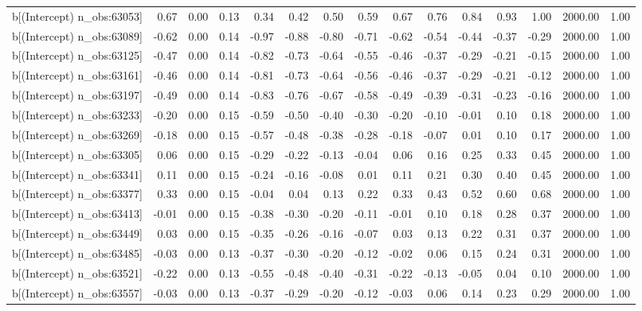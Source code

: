 \begin{table}[ht]
\begin{tabular}{rrrrrrrrrrrrrrr}
  b[(Intercept) n\_obs:63053] & 0.67 & 0.00 & 0.13 & 0.34 & 0.42 & 0.50 & 0.59 & 0.67 & 0.76 & 0.84 & 0.93 & 1.00 & 2000.00 & 1.00 \\ 
  b[(Intercept) n\_obs:63089] & -0.62 & 0.00 & 0.14 & -0.97 & -0.88 & -0.80 & -0.71 & -0.62 & -0.54 & -0.44 & -0.37 & -0.29 & 2000.00 & 1.00 \\ 
  b[(Intercept) n\_obs:63125] & -0.47 & 0.00 & 0.14 & -0.82 & -0.73 & -0.64 & -0.55 & -0.46 & -0.37 & -0.29 & -0.21 & -0.15 & 2000.00 & 1.00 \\ 
  b[(Intercept) n\_obs:63161] & -0.46 & 0.00 & 0.14 & -0.81 & -0.73 & -0.64 & -0.56 & -0.46 & -0.37 & -0.29 & -0.21 & -0.12 & 2000.00 & 1.00 \\ 
  b[(Intercept) n\_obs:63197] & -0.49 & 0.00 & 0.14 & -0.83 & -0.76 & -0.67 & -0.58 & -0.49 & -0.39 & -0.31 & -0.23 & -0.16 & 2000.00 & 1.00 \\ 
  b[(Intercept) n\_obs:63233] & -0.20 & 0.00 & 0.15 & -0.59 & -0.50 & -0.40 & -0.30 & -0.20 & -0.10 & -0.01 & 0.10 & 0.18 & 2000.00 & 1.00 \\ 
  b[(Intercept) n\_obs:63269] & -0.18 & 0.00 & 0.15 & -0.57 & -0.48 & -0.38 & -0.28 & -0.18 & -0.07 & 0.01 & 0.10 & 0.17 & 2000.00 & 1.00 \\ 
  b[(Intercept) n\_obs:63305] & 0.06 & 0.00 & 0.15 & -0.29 & -0.22 & -0.13 & -0.04 & 0.06 & 0.16 & 0.25 & 0.33 & 0.45 & 2000.00 & 1.00 \\ 
  b[(Intercept) n\_obs:63341] & 0.11 & 0.00 & 0.15 & -0.24 & -0.16 & -0.08 & 0.01 & 0.11 & 0.21 & 0.30 & 0.40 & 0.45 & 2000.00 & 1.00 \\ 
  b[(Intercept) n\_obs:63377] & 0.33 & 0.00 & 0.15 & -0.04 & 0.04 & 0.13 & 0.22 & 0.33 & 0.43 & 0.52 & 0.60 & 0.68 & 2000.00 & 1.00 \\ 
  b[(Intercept) n\_obs:63413] & -0.01 & 0.00 & 0.15 & -0.38 & -0.30 & -0.20 & -0.11 & -0.01 & 0.10 & 0.18 & 0.28 & 0.37 & 2000.00 & 1.00 \\ 
  b[(Intercept) n\_obs:63449] & 0.03 & 0.00 & 0.15 & -0.35 & -0.26 & -0.16 & -0.07 & 0.03 & 0.13 & 0.22 & 0.31 & 0.37 & 2000.00 & 1.00 \\ 
  b[(Intercept) n\_obs:63485] & -0.03 & 0.00 & 0.13 & -0.37 & -0.30 & -0.20 & -0.12 & -0.02 & 0.06 & 0.15 & 0.24 & 0.31 & 2000.00 & 1.00 \\ 
  b[(Intercept) n\_obs:63521] & -0.22 & 0.00 & 0.13 & -0.55 & -0.48 & -0.40 & -0.31 & -0.22 & -0.13 & -0.05 & 0.04 & 0.10 & 2000.00 & 1.00 \\ 
  b[(Intercept) n\_obs:63557] & -0.03 & 0.00 & 0.13 & -0.37 & -0.29 & -0.20 & -0.12 & -0.03 & 0.06 & 0.14 & 0.23 & 0.29 & 2000.00 & 1.00 \\ 

\end{tabular}
\end{table}
